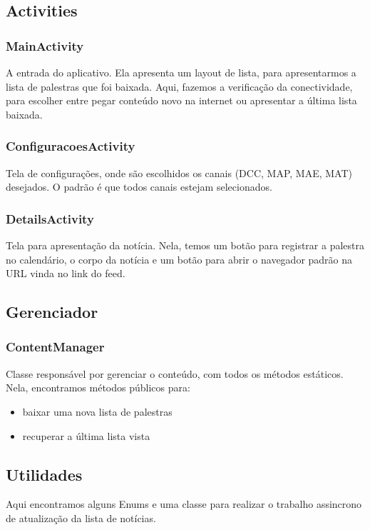\subsection{Activities}

\subsubsection{MainActivity}
A entrada do aplicativo. Ela apresenta um layout de lista, para apresentarmos a lista de palestras que foi baixada.
Aqui, fazemos a verificação da conectividade, para escolher entre pegar conteúdo novo na internet ou apresentar a última lista
baixada.

\subsubsection{ConfiguracoesActivity}
Tela de configurações, onde são escolhidos os canais (DCC, MAP, MAE, MAT) desejados. O padrão é que todos canais estejam selecionados.

\subsubsection{DetailsActivity}
Tela para apresentação da notícia. Nela, temos um botão para registrar a palestra no calendário, o corpo da notícia e um botão para abrir o navegador padrão na URL vinda no link do feed.

\subsection{Gerenciador}
\subsubsection{ContentManager}
Classe responsável por gerenciar o conteúdo, com todos os métodos estáticos. Nela, encontramos métodos públicos para:
\begin{itemize}
\item baixar uma nova lista de palestras
\item recuperar a última lista vista
\end{itemize}

\subsection{Utilidades}
Aqui encontramos alguns Enums e uma classe para realizar o trabalho assincrono de atualização da lista de notícias.


